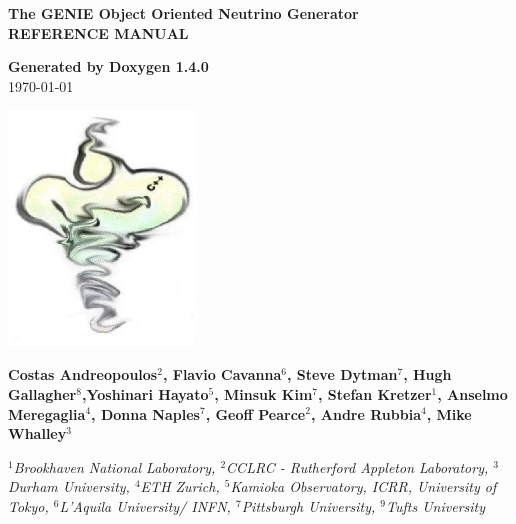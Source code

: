 \documentclass[a4paper]{book}
\begin{document}
\begin{titlepage}
\vspace*{3cm}
\begin{center}

{\Large \textbf{The GENIE Object Oriented Neutrino Generator}}\\
\vspace*{1cm}
{\Large \textbf{REFERENCE MANUAL}}\\
\vspace*{1cm}

{\large \textbf{Generated by Doxygen 1.4.0}}\\
\vspace*{0.5cm}
{\large \today}\\
\vspace*{1cm}

\includegraphics[width=5cm,keepaspectratio]{../../data/logo/genie_logo.eps}

\vspace*{0.6cm}

{\textbf{Costas Andreopoulos$^{2}$, Flavio Cavanna$^{6}$, Steve Dytman$^{7}$,
Hugh Gallagher$^{8}$,Yoshinari Hayato$^{5}$, Minsuk Kim$^{7}$, Stefan Kretzer$^{1}$, Anselmo Meregaglia$^{4}$,
Donna Naples$^{7}$, Geoff Pearce$^{2}$, Andre Rubbia$^{4}$, Mike Whalley$^{3}$}}\\
\vspace*{0.5cm}

{\textit{
$^{1}$Brookhaven National Laboratory, 
$^{2}$CCLRC - Rutherford Appleton Laboratory,
$^{3}$Durham University, 
$^{4}$ETH Zurich, 
$^{5}$Kamioka Observatory, ICRR, University of Tokyo, 
$^{6}$L'Aquila University/ INFN, 
$^{7}$Pittsburgh University, $^{9}$Tufts University}}

\end{center}
\end{titlepage}
\clearemptydoublepage
{}
\tableofcontents
\clearemptydoublepage
{}
\end{document}
